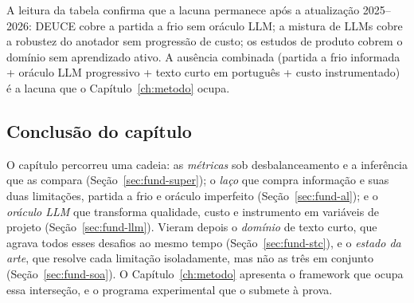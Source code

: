 A leitura da tabela confirma que a lacuna permanece após a atualização
2025--2026: DEUCE cobre a partida a frio sem oráculo LLM; a mistura de LLMs
cobre a robustez do anotador sem progressão de custo; os estudos de produto
cobrem o domínio sem aprendizado ativo. A ausência combinada (partida a
frio informada + oráculo LLM progressivo + texto curto em português + custo
instrumentado) é a lacuna que o Capítulo~\ref{ch:metodo} ocupa.

\subsection{Conclusão do capítulo}
\label{sec:fund-conclusao}

O capítulo percorreu uma cadeia: as \emph{métricas} sob desbalanceamento e a
inferência que as compara (Seção~\ref{sec:fund-super}); o \emph{laço} que
compra informação e suas duas limitações, partida a frio e oráculo imperfeito
(Seção~\ref{sec:fund-al}); e o \emph{oráculo LLM} que transforma qualidade,
custo e instrumento em variáveis de projeto (Seção~\ref{sec:fund-llm}).
Vieram depois o \emph{domínio} de texto curto, que agrava todos esses
desafios ao mesmo tempo (Seção~\ref{sec:fund-stc}), e o \emph{estado da
arte}, que resolve cada limitação isoladamente, mas não as três em conjunto
(Seção~\ref{sec:fund-soa}). O Capítulo~\ref{ch:metodo} apresenta o framework
que ocupa essa interseção, e o programa experimental que o submete à prova.
